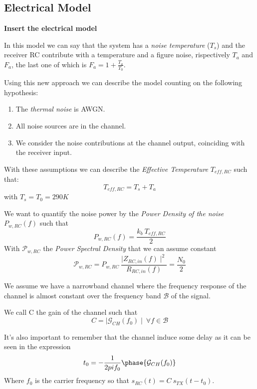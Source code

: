 \subsection{Electrical Model}
\textbf{Insert the electrical model}

In this model we can say that the system has a \textit{noise temperature} ($T_s$) and the receiver RC contribute with a temperature and a figure noise, rispectively $T_a$ and $F_a$, the last one of which is $F_a = 1 + \frac{T_a}{T_0}$.

Using this new approach we can describe the model counting on the following hypothesis: 
\begin{enumerate}
\item The \textit{thermal noise} is AWGN.
\item All noise sources are in the channel.
\item We consider the noise contributions at the channel output, coinciding with the receiver input.
\end{enumerate}

With these assumptions we can describe the \textit{Effective Temperature} $T_{eff,RC}$ such that:
\begin{equation}
T_{eff,RC} = T_s + T_a
\end{equation}
with $T_s = T_0 = 290K$

We want to quantify the noise power by the \textit{Power Density of the noise} $P_{w,RC}(f)$ such that
$$P_{w,RC} (f) = \frac{k_b \ T_{eff,RC}}{2}$$
With $\mathcal{P}_{w,RC}$ the \textit{Power Spectral Density} that we can assume constant
\begin{equation}
\mathcal{P}_{w,RC} = P_{w,RC}\ \frac{\mid Z_{RC,in}(f)\mid ^2}{R_{RC,in}(f)} = \frac{N_0}{2}
\end{equation}

We assume we have a narrowband channel where the frequency response of the channel is almost constant over the frequency band $\mathcal{B}$ of the signal.

We call C the gain of the channel such that 
\begin{equation}
C = \mid \mathcal{G}_{CH}(f_0) \mid \ \forall f \in \mathcal{B}
\end{equation}

It's also important to remember that the channel induce some delay as it can be seen in the expression
\begin{equation}
t_0 = -\frac{1}{2pif_0} \phase{\mathcal{G}_{CH}(f_0)}
\end{equation}
Where $f_0$ is the carrier frequency so that $s_{RC}(t) = C\ s_{TX}(t - t_0)$.

